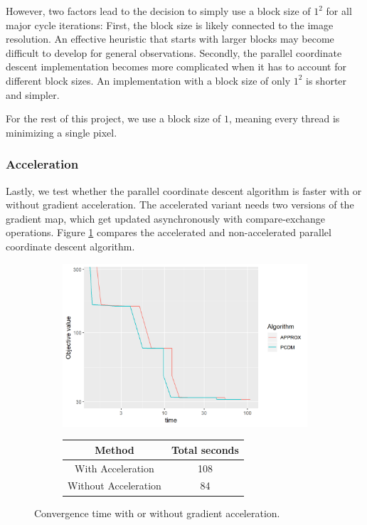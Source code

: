 However, two factors lead to the decision to simply use a block size of $1^2$ for all major cycle iterations: First, the block size is likely connected to the image resolution. An effective heuristic that starts with larger blocks may become difficult to develop for general observations. Secondly, the parallel coordinate descent implementation becomes more complicated when it has to account for different block sizes. An implementation with a block size of only $1^2$ is shorter and simpler.

For the rest of this project, we use a block size of $1$, meaning every thread is minimizing a single pixel.


\subsubsection*{Acceleration}
Lastly, we test whether the parallel coordinate descent algorithm is faster with or without gradient acceleration. The accelerated variant needs two versions of the gradient map, which get updated asynchronously with compare-exchange operations. Figure \ref{pcdm:results:acc} compares the accelerated and non-accelerated parallel coordinate descent algorithm.

\begin{figure}[h]
	\centering
	\begin{subfigure}{0.6\linewidth}
		\includegraphics[width=1.0\linewidth]{./chapters/05.pcdm/parameters/acceleration.png}
	\end{subfigure}
	\begin{subfigure}{0.35\linewidth}
		\begin{tabular}{c | c}
			Method & Total seconds \\ \hline
			With Acceleration & 108 \\
			Without Acceleration & 84 \\
		\end{tabular}
	\end{subfigure}
	\caption{Convergence time with or without gradient acceleration.}
	\label{pcdm:results:acc}
\end{figure}

